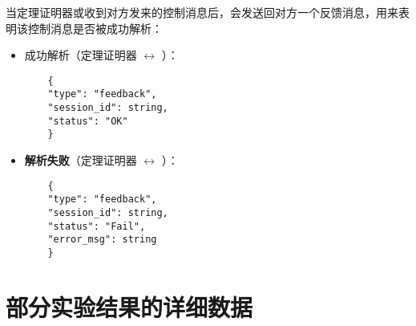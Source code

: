 当定理证明器或收到对方发来的控制消息后，会发送回对方一个反馈消息，用来表明该控制消息是否被成功解析：
\begin{itemize}
	\item \textsf{成功解析}（定理证明器 $\longleftrightarrow$ ）：
	\begin{verbatim}
	{
	"type": "feedback",
	"session_id": string,
	"status": "OK"
	}
	\end{verbatim}
	\item \textbf{解析失败}（定理证明器 $\longleftrightarrow$ ）：
	\begin{verbatim}
	{
	"type": "feedback",
	"session_id": string,
	"status": "Fail",
	"error_msg": string
	}
	\end{verbatim}
\end{itemize}
\cleardoublepage
\chapter{部分实验结果的详细数据}\label{appendix:detail:data}

